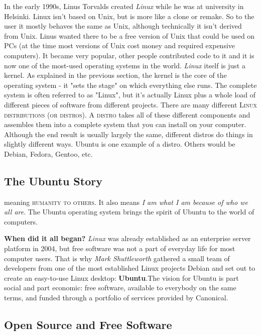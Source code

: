 \documentclass{tufte-book} %
\begin{document}
In the early 1990s, Linus Torvalds created \textit{Linux} while he was at university in Helsinki. Linux isn't based on Unix, but is more like a clone or remake. So to the user it mostly behaves the same as Unix, although technically it isn't derived from Unix. Linus wanted there to be a free version of Unix that could be used on PCs (at the time most versions of Unix cost money and required expensive computers). It became very popular, other people contributed code to it and it is now one of the most-used operating systems in the world.
\textit{Linux} itself is just a kernel. As explained in the previous section, the kernel is the core of the operating system - it "sets the stage" on which everything else runs. The complete system is often referred to as "Linux", but it's actually Linux plus a whole load of different pieces of software from different projects.
There are many different \textsc{Linux distributions (or distros)}. A \textsc{distro} takes all of these different components and assembles them into a complete system that you can install on your computer. Although the end result is usually largely the same, different distros do things in slightly different ways. Ubuntu is one example of a distro. Others would be Debian, Fedora, Gentoo, etc.

\subsection[Ubuntu]{The Ubuntu Story}

 meaning \textsc{humanity to others}. It also means \emph{I am what I am because of who we all are}. The Ubuntu operating system brings the spirit of Ubuntu to the world of computers.

\textbf{When did it all began?}
\emph{Linux} was already established as an enterprise server platform in 2004, but free software was not a part of everyday life for most computer users. That is why \textit{Mark Shuttleworth} gathered a small team of developers from one of the most established Linux projects Debian and set out to create an easy-to-use Linux desktop:\textbf{ Ubuntu}.The vision for Ubuntu is part social and part economic: free software, available to everybody on the same terms, and funded through a portfolio of services provided by Canonical.
\subsection[Open Source]{Open Source and Free Software }
\end{document}
